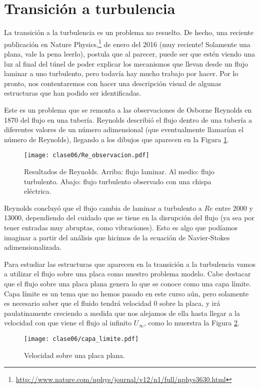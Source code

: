 \section*{Transición a turbulencia}

La transición a la turbulencia es un problema no resuelto.
De hecho, una reciente publicación en Nature Physics,\footnote{\url{http://www.nature.com/nphys/journal/v12/n1/full/nphys3630.html}} de enero del 2016 (muy reciente! Solamente una plana, vale la pena leerlo), postula que al parecer, puede ser que estén viendo una luz al final del túnel de poder explicar los mecanismos que llevan desde un flujo laminar a uno turbulento, pero todavía hay mucho trabajo por hacer.
Por lo pronto, nos contentaremos con hacer una descripción visual de algunas estructuras que han podido ser identificadas.

Este es un problema que se remonta a las observaciones de Osborne Reynolds en 1870 del flujo en una tubería.
Reynolds describió el flujo dentro de una tubería a diferentes valores de un número adimensional (que eventualmente llamarían el número de Reynolds), llegando a los dibujos que aparecen en la Figura \ref{fig:Re_observacion}.
%
\begin{figure}[h!]
\centering
\texttt{[image: clase06/Re\_observacion.pdf]}
\caption{Resultados de Reynolds. Arriba: flujo laminar. Al medio: flujo turbulento. Abajo: flujo turbulento observado con una chispa eléctrica.}
\label{fig:Re_observacion}
\end{figure}

Reynolds concluyó que el flujo cambia de laminar a turbulento a $Re$ entre 2000 y 13000, dependiendo del cuidado que se tiene en la disrupción del flujo (ya sea por tener entradas muy abruptas, como vibraciones).
Esto es algo que podíamos imaginar a partir del análisis que hicimos de la ecuación de Navier-Stokes adimensionalizada.

Para estudiar las estructuras que aparecen en la transición a la turbulencia vamos a utilizar el flujo sobre una placa como nuestro problema modelo.
Cabe destacar que el flujo sobre una placa plana genera lo que se conoce como una capa límite. 
Capa límite es un tema que no hemos pasado en este curso aún, pero solamente es necesario saber que el fluido tendrá velocidad 0 sobre la placa, y irá paulatinamente creciendo a medida que nos alejamos de ella hasta llegar a la velocidad con que viene el flujo al infinito $U_\infty$, como lo muerstra la Figura \ref{fig:capa_limite}.
%
\begin{figure}[h!]
\centering
\texttt{[image: clase06/capa\_limite.pdf]}
\caption{Velocidad sobre una placa plana.}
\label{fig:capa_limite}
\end{figure}

